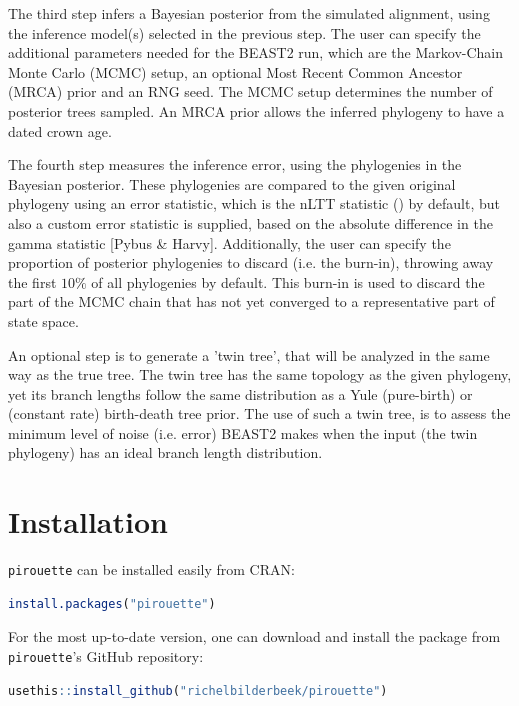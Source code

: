 \documentclass{article}
\begin{document}
The third step infers a Bayesian posterior from the simulated alignment,
using the inference model(s) selected in the previous step. The user
can specify the additional parameters needed for the BEAST2 run, which
are the Markov-Chain Monte Carlo (MCMC) setup, 
an optional Most Recent Common Ancestor (MRCA) prior and an RNG seed.
The MCMC setup determines the number of posterior trees sampled.
An MRCA prior allows the inferred phylogeny to have a dated crown age.

The fourth step measures the inference error, using the phylogenies in the
Bayesian posterior. These phylogenies are compared to the given
original phylogeny using an error statistic, which is the nLTT 
statistic (\cite{janzen2015approximate}) by default,
but also a custom error statistic is supplied, based
on the absolute difference in the gamma statistic [Pybus \& Harvy]. 
Additionally, the user can specify the
proportion of posterior phylogenies to 
discard (i.e. the burn-in), throwing away the first $10\%$
of all phylogenies by default. This burn-in is used to discard
the part of the MCMC chain that has not yet converged to a
representative part of state space.

An optional step is to generate a 'twin tree', that will be
analyzed in the same way as the true tree. The twin tree has the same
topology as the given phylogeny, yet its branch lengths follow the same
distribution as a Yule (pure-birth) or (constant rate) birth-death tree prior.
The use of such a twin tree, is to assess the minimum level of noise (i.e. 
error) BEAST2 makes when the input (the twin phylogeny) has an ideal branch
length distribution.

\section{Installation}

\verb;pirouette; can be installed easily from CRAN:

\begin{lstlisting}[language=R, floatplacement=H, frame=single]
install.packages("pirouette")
\end{lstlisting}

For the most up-to-date version, 
one can download and install the package from \verb;pirouette;'s GitHub repository:

\begin{lstlisting}[language=R, floatplacement=H, frame=single]
usethis::install_github("richelbilderbeek/pirouette")
\end{lstlisting}
\end{document}
